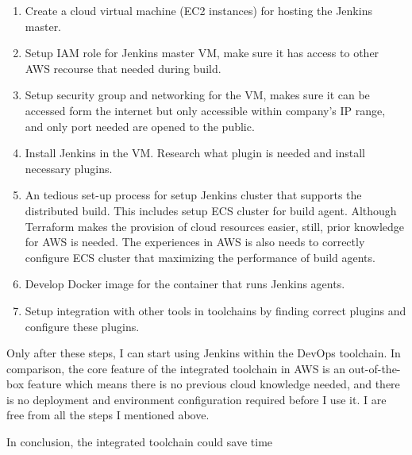 \begin{enumerate} 
 \item Create a cloud virtual machine (EC2 instances) for hosting the Jenkins master.
 \item Setup IAM role for Jenkins master VM, make sure it has access to other AWS recourse that needed during build.
 \item Setup security group and networking for the VM, makes sure it can be accessed form the internet but only accessible within company's IP range, and only port needed are opened to the public.
 \item Install Jenkins in the VM. Research what plugin is needed and install necessary plugins.
 \item An tedious set-up process for setup Jenkins cluster that supports the distributed build. This includes setup ECS cluster for build agent. Although Terraform makes the provision of cloud resources easier, still, prior knowledge for AWS is needed. The experiences in AWS is also needs to correctly configure ECS cluster that maximizing the performance of build agents.
 \item Develop Docker image for the container that runs Jenkins agents.
 \item Setup integration with other tools in toolchains by finding correct plugins and configure these plugins. 
\end{enumerate}
Only after these steps, I can start using Jenkins within the DevOps toolchain.
In comparison, the core feature of the integrated toolchain in AWS is an out-of-the-box feature which means there is no previous cloud knowledge needed, and there is no deployment and environment configuration required before I use it. I are free from all the steps I mentioned above. 
\par
In conclusion, the integrated toolchain could save time

